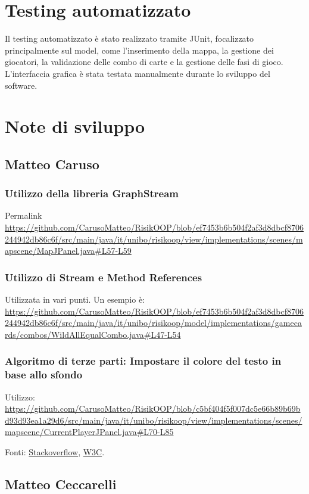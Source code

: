 \documentclass[a4paper,12pt]{report}
\begin{document}
\section{Testing automatizzato}
Il testing automatizzato è stato realizzato tramite JUnit, focalizzato principalmente sul model, come l'inserimento della mappa, la gestione dei giocatori, la validazione delle combo di carte e la gestione delle fasi di gioco.
L'interfaccia grafica è stata testata manualmente durante lo sviluppo del software.

\section{Note di sviluppo}
\subsection{Matteo Caruso}
\subsubsection{Utilizzo della libreria GraphStream}
Permalink \url{https://github.com/CarusoMatteo/RisikOOP/blob/ef7453b6b504f2af3d8dbcf8706244942db86c6f/src/main/java/it/unibo/risikoop/view/implementations/scenes/mapscene/MapJPanel.java#L57-L59}
\subsubsection{Utilizzo di Stream e Method References}
Utilizzata in vari punti. Un esempio è: \url{https://github.com/CarusoMatteo/RisikOOP/blob/ef7453b6b504f2af3d8dbcf8706244942db86c6f/src/main/java/it/unibo/risikoop/model/implementations/gamecards/combos/WildAllEqualCombo.java#L47-L54}
\subsubsection{Algoritmo di terze parti: Impostare il colore del testo in base allo sfondo}
Utilizzo: \url{https://github.com/CarusoMatteo/RisikOOP/blob/c5bf404f5f007dc5e66b89b69bd93d93ea1a29d6/src/main/java/it/unibo/risikoop/view/implementations/scenes/mapscene/CurrentPlayerJPanel.java#L70-L85}

Fonti: \href{https://stackoverflow.com/a/596243}{Stackoverflow}, \href{https://www.w3.org/TR/AERT#color-contrast}{W3C}.

\subsection{Matteo Ceccarelli}
\end{document}
